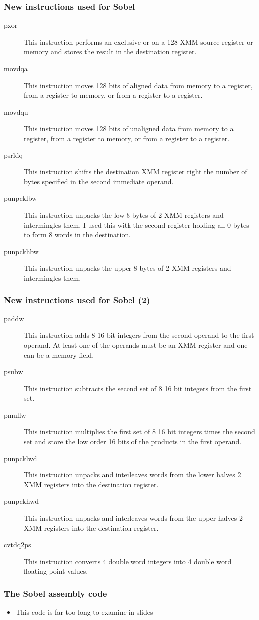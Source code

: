 \documentclass{beamer}
\begin{document}
\begin{frame}
    \frametitle{New instructions used for Sobel}
\begin{description}
    \item [pxor] This instruction performs an exclusive or on a 128 XMM
          source register or memory and stores the result in the destination register.
    \item [movdqa] This instruction moves 128 bits of aligned data from memory
                   to a register, from a register to memory, or from a register
                   to a register.
    \item [movdqu] This instruction moves 128 bits of unaligned data from memory
                   to a register, from a register to memory, or from a register
                   to a register.
    \item [psrldq] This instruction shifts the destination XMM register right the
                   number of bytes specified in the second immediate operand.
    \item [punpcklbw] This instruction unpacks the low 8 bytes of 2 XMM registers
                   and intermingles them. I used this with the second register
                   holding all 0 bytes to form 8 words in the destination.
    \item [punpckhbw] This instruction unpacks the upper 8 bytes of 2 XMM
                   registers and intermingles them.
\end{description}
\end{frame}

\begin{frame}
    \frametitle{New instructions used for Sobel (2)}
\begin{description}
    \item [paddw]  This instruction adds 8 16 bit integers from the second
                   operand to the first operand.  At least one of the operands
                   must be an XMM register and one can be a memory field.
    \item [psubw]  This instruction subtracts the second set of 8 16 bit integers
                   from the first set.
    \item [pmullw] This instruction multiplies the first set of 8 16 bit integers
                   times the second set and store the low order 16 bits of the
                   products in the first operand.
    \item [punpcklwd]   This instruction unpacks and interleaves words from
                   the lower halves 2 XMM registers into the destination register.
    \item [punpckhwd]   This instruction unpacks and interleaves words from
                   the upper halves 2 XMM registers into the destination register.
    \item [cvtdq2ps]  This instruction converts 4 double word integers into
                   4 double word floating point values.
\end{description}
\end{frame}

\begin{frame}
    \frametitle{The Sobel assembly code}
    \begin{itemize}
        \item This code is far too long to examine in slides
    \end{itemize}
\end{frame}
\end{document}
